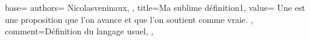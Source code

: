 {
  base={
    authors={
      Nicolasveninaux,
    },
    title=Ma sublime définition1,
    value={%
      Une  est une proposition que l'on avance et que l'on soutient comme vraie.%
    },
    comment={Définition du langage usuel},
  },
}
